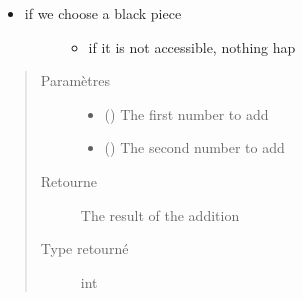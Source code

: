 \documentclass[letterpaper,10pt,french]{sphinxmanual}
\begin{document}
\begin{fulllineitems}
\begin{fulllineitems}
\begin{itemize}
\begin{description}
\begin{itemize}
\end{itemize}

\end{description}

\item {} \begin{description}
\item[{if we choose a black piece}] \leavevmode\begin{itemize}
\item {} 
if it is not accessible, nothing hap

\end{itemize}

\end{description}

\end{itemize}
\begin{quote}\begin{description}
\item[{Paramètres}] \leavevmode\begin{itemize}
\item {} 
 () \textendash{} The first number to add

\item {} 
 () \textendash{} The second number to add

\end{itemize}

\item[{Retourne}] \leavevmode
The result of the addition

\item[{Type retourné}] \leavevmode
int

\end{description}\end{quote}

\end{fulllineitems}


\begin{fulllineitems}
\label{\detokenize{autodoc:gui.Ui_Dialog.retranslateUi}}
\end{fulllineitems}


\begin{fulllineitems}
\label{\detokenize{autodoc:gui.Ui_Dialog.setupUi}}
\end{fulllineitems}


\end{fulllineitems}
\end{document}

